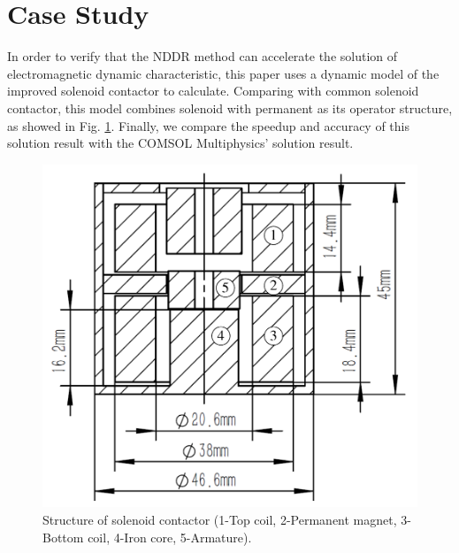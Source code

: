 \documentclass[journal,transmag]{IEEEtran}
\begin{document}
\section{Case Study}
In order to verify that the NDDR method can accelerate the solution of electromagnetic dynamic characteristic, this paper uses a dynamic model of the improved solenoid contactor to calculate. Comparing with common solenoid contactor, this model combines solenoid with permanent as its operator structure, as showed in Fig. \ref{fig:contactor}. Finally, we compare the speedup and accuracy of this solution result with the COMSOL Multiphysics' solution result.
\begin{figure}
	\centering
	\includegraphics[width=0.7\linewidth]{contactor1.pdf}
	\caption{Structure of solenoid contactor (1-Top coil, 2-Permanent magnet, 3-Bottom coil, 4-Iron core, 5-Armature).}
	\label{fig:contactor}
\end{figure}
\end{document}
